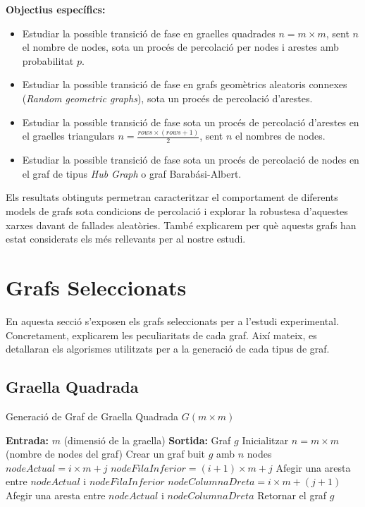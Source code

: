 \documentclass[a4paper]{article}
\begin{document}
	\textbf{Objectius específics:}
	\begin{itemize}
		\item Estudiar la possible transició de fase en graelles quadrades \( n = m \times m \), sent \( n \) el nombre de nodes, sota un procés de percolació per nodes i arestes amb probabilitat \( p \).
		\item Estudiar la possible transició de fase en grafs geomètrics aleatoris connexes (\textit{Random geometric graphs}), sota un procés de percolació d’arestes.
		\item Estudiar la possible transició de fase sota un procés de percolació d'arestes en el graelles triangulars $n = \frac{rows \times (rows + 1)}{2}$, sent $n$ el nombres de nodes.
		\item Estudiar la possible transició de fase sota un procés de percolació de nodes en el graf de tipus \textit{Hub Graph} o graf Barabási-Albert.
	\end{itemize}
	
	Els resultats obtinguts permetran caracteritzar el comportament de diferents models de grafs sota condicions de percolació i explorar la robustesa d'aquestes xarxes davant de fallades aleatòries. També explicarem per què aquests grafs han estat considerats els més rellevants per al nostre estudi.
	
	
	\newpage
	\section{Grafs Seleccionats}

	En aquesta secció s'exposen els grafs seleccionats per a l'estudi experimental. Concretament, explicarem les peculiaritats de cada graf. Així mateix, es detallaran els algorismes utilitzats per a la generació de cada tipus de graf. 

	\subsection{Graella Quadrada}
	\begin{algorithm} [H]
		\caption{Generació de Graf de Graella Quadrada $G(m \times m)$}
		\begin{algorithmic} [1]
			\Statex \textbf{Entrada:} $m$ (dimensió de la graella)
			\Statex \textbf{Sortida:} Graf $g$ 
			\Statex \vspace{-0.25em}
			\State Inicialitzar $n = m \times m$ (nombre de nodes del graf)
			\State Crear un graf buit $g$ amb $n$ nodes
					\State $nodeActual = i \times m + j$
						\State $nodeFilaInferior = (i + 1) \times m + j$
						\State Afegir una aresta entre $nodeActual$ i $nodeFilaInferior$
					\EndIf
						\State $nodeColumnaDreta = i \times m + (j + 1)$
						\State Afegir una aresta entre $nodeActual$ i $nodeColumnaDreta$
					\EndIf
				\EndFor
			\EndFor
			\State Retornar el graf $g$
		\end{algorithmic}
	\end{algorithm}
\end{document}
